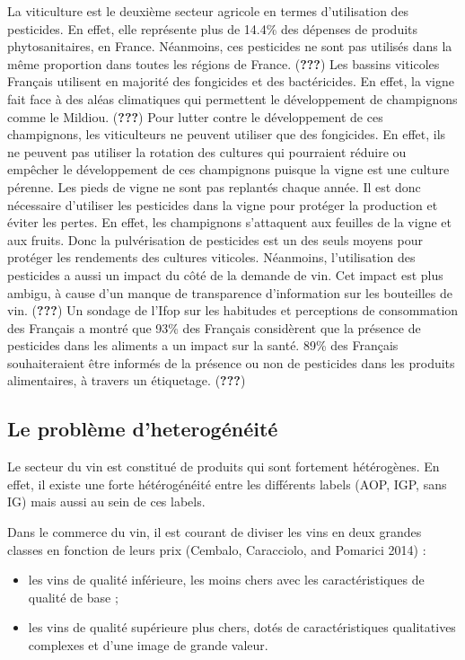 \documentclass[11pt,]{article}
\providecommand{\tightlist}{%
  \setlength{\itemsep}{0pt}\setlength{\parskip}{0pt}}
\begin{document}
La viticulture est le deuxième secteur agricole en termes d'utilisation
des pesticides. En effet, elle représente plus de 14.4\% des dépenses de
produits phytosanitaires, en France. Néanmoins, ces pesticides ne sont
pas utilisés dans la même proportion dans toutes les régions de France.
({\textbf{???}}) Les bassins viticoles Français utilisent en majorité
des fongicides et des bactéricides. En effet, la vigne fait face à des
aléas climatiques qui permettent le développement de champignons comme
le Mildiou. ({\textbf{???}}) Pour lutter contre le développement de ces
champignons, les viticulteurs ne peuvent utiliser que des fongicides. En
effet, ils ne peuvent pas utiliser la rotation des cultures qui
pourraient réduire ou empêcher le développement de ces champignons
puisque la vigne est une culture pérenne. Les pieds de vigne ne sont pas
replantés chaque année. Il est donc nécessaire d'utiliser les pesticides
dans la vigne pour protéger la production et éviter les pertes. En
effet, les champignons s'attaquent aux feuilles de la vigne et aux
fruits. Donc la pulvérisation de pesticides est un des seuls moyens pour
protéger les rendements des cultures viticoles. Néanmoins, l'utilisation
des pesticides a aussi un impact du côté de la demande de vin. Cet
impact est plus ambigu, à cause d'un manque de transparence
d'information sur les bouteilles de vin. ({\textbf{???}}) Un sondage de
l'Ifop sur les habitudes et perceptions de consommation des Français a
montré que 93\% des Français considèrent que la présence de pesticides
dans les aliments a un impact sur la santé. 89\% des Français
souhaiteraient être informés de la présence ou non de pesticides dans
les produits alimentaires, à travers un étiquetage. ({\textbf{???}})

\hypertarget{le-probleme-dheterogeneite}{%
\subsection{Le problème
d'heterogénéité}\label{le-probleme-dheterogeneite}}

Le secteur du vin est constitué de produits qui sont fortement
hétérogènes. En effet, il existe une forte hétérogénéité entre les
différents labels (AOP, IGP, sans IG) mais aussi au sein de ces labels.

Dans le commerce du vin, il est courant de diviser les vins en deux
grandes classes en fonction de leurs prix (Cembalo, Caracciolo, and
Pomarici 2014) :

\begin{itemize}
\tightlist
\item
  les vins de qualité inférieure, les moins chers avec les
  caractéristiques de qualité de base ;
\item
  les vins de qualité supérieure plus chers, dotés de caractéristiques
  qualitatives complexes et d'une image de grande valeur.
\end{itemize}
\end{document}
